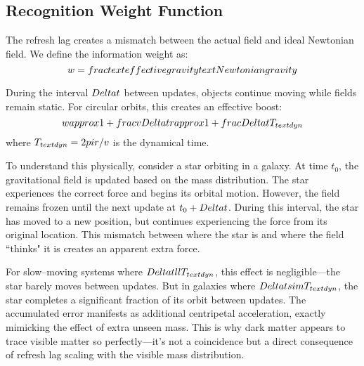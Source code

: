 \documentclass[twocolumn,prd,amsmath,amssymb,aps,superscriptaddress,nofootinbib]{revtex4-2}
\begin{document}
\subsection{Recognition Weight Function}

The refresh lag creates a mismatch between the actual field and ideal Newtonian field. We define the information weight as:
\begin{equation}
w = \\frac{\\text{effective gravity}}{\\text{Newtonian gravity}}
\end{equation}

During the interval $\\Delta t$ between updates, objects continue moving while fields remain static. For circular orbits, this creates an effective boost:
\begin{equation}
w \\approx 1 + \\frac{v \\Delta t}{r} \\approx 1 + \\frac{\\Delta t}{T_{\\text{dyn}}}
\end{equation}
where $T_{\\text{dyn}} = 2\\pi r/v$ is the dynamical time.

To understand this physically, consider a star orbiting in a galaxy. At time $t_0$, the gravitational field is updated based on the mass distribution. The star experiences the correct force and begins its orbital motion. However, the field remains frozen until the next update at $t_0 + \\Delta t$. During this interval, the star has moved to a new position, but continues experiencing the force from its original location. This mismatch between where the star is and where the field ``thinks" it is creates an apparent extra force.

For slow--moving systems where $\\Delta t \\ll T_{\\text{dyn}}$, this effect is negligible---the star barely moves between updates. But in galaxies where $\\Delta t \\sim T_{\\text{dyn}}$, the star completes a significant fraction of its orbit between updates. The accumulated error manifests as additional centripetal acceleration, exactly mimicking the effect of extra unseen mass. This is why dark matter appears to trace visible matter so perfectly---it's not a coincidence but a direct consequence of refresh lag scaling with the visible mass distribution.
\end{document}
